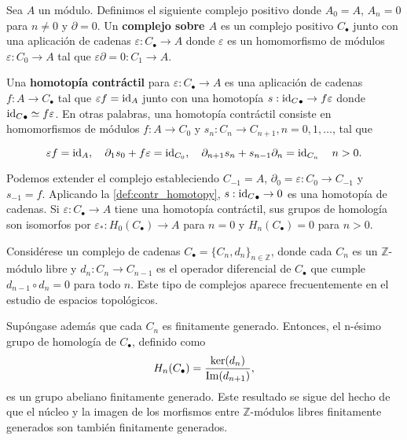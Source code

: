\begin{definicion}
	Sea \(A\) un módulo. Definimos el siguiente complejo positivo donde \(A_{0} = A\),
	\(A_{n} = 0\) para \(n \neq 0\) y \(\partial = 0\). Un \textbf{complejo sobre \(A\)} es
	un complejo positivo \(C_{\bullet}\) junto con una aplicación de cadenas \(\varepsilon
	: C_{\bullet}\to A\) donde \(\varepsilon\) es un homomorfismo de módulos \(\varepsilon
	: C_{0} \to A\) tal que \(\varepsilon \partial = 0: C_{1} \to A\).
\end{definicion}

\begin{definicion}
	\label{def:contr_homotopy} Una \textbf{homotopía contráctil} para
	\(\varepsilon: C_{\bullet}\to A\) es una aplicación de cadenas
	\(f: A \to C_{\bullet}\) tal que \(\varepsilon f = \operatorname{id}_{A}\) junto con una
	homotopía \(s:{\operatorname{id}_C}_{\bullet}\rightarrow f \varepsilon\) donde
	\({\operatorname{id}_C}_{\bullet}\simeq f \varepsilon\). En otras palabras, una homotopía
	contráctil consiste en homomorfismos de módulos \(f: A \to C_{0}\) y
	\(s_{n}: C_{n} \to C_{n+1}, n = 0, 1, \ldots\), tal que

	\[
		\varepsilon f = \operatorname{id}_{A}, \quad \partial_{1}s_{0} + f \varepsilon = \operatorname{id}_{C_0},
		\quad \partial_{n+1}s_{n} + s_{n-1}\partial_{n} = \operatorname{id}_{C_n}\quad n > 0.
	\]
\end{definicion}

Podemos extender el complejo estableciendo \(C_{-1}= A\),
\(\partial_{0} = \varepsilon: C_{0} \to C_{-1}\) y \(s_{-1}= f\). Aplicando la \autoref{def:contr_homotopy},
\(s:{\operatorname{id}_C}_{\bullet}\rightarrow 0\) es una homotopía de cadenas. Si \(\varepsilon:
C_{\bullet}\to A\) tiene una homotopía contráctil, sus grupos de homología son
isomorfos por \(\varepsilon_{*}: H_{0}(C_{\bullet}) \rightarrow A\) para \(n = 0\) y
\(H_{n}(C_{\bullet}) = 0\) para \(n > 0\).

Considérese un complejo de cadenas
\(C_{\bullet}= \{ C_{n}, d_{n} \}_{n \in \mathbb{Z}}\), donde cada \(C_{n}\) es un \(\mathbb{Z}\)-módulo
libre y \(d_{n}: C_{n} \to C_{n-1}\) es el operador diferencial de \(C_{\bullet}\) que
cumple \(d_{n-1}\circ d_{n} = 0\) para todo \(n\). Este tipo de complejos aparece
frecuentemente en el estudio de espacios topológicos.

Supóngase además que cada \(C_{n}\) es finitamente generado. Entonces, el n-ésimo
grupo de homología de \(C_{\bullet}\), definido como
\[
	H_{n}(C_{\bullet}) = \frac{\ker(d_{n})}{\operatorname{Im}(d_{n+1})},
\]
es un grupo abeliano finitamente generado. Este resultado se sigue del hecho de
que el núcleo y la imagen de los morfismos entre \(\mathbb{Z}\)-módulos libres
finitamente generados son también finitamente generados.

